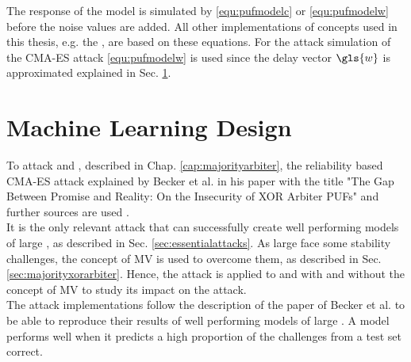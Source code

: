 The response of the \apuf model is simulated by \ref{equ:pufmodelc} or \ref{equ:pufmodelw} before the noise values are added.
All other implementations of \puf concepts used in this thesis, e.g. the \mpuf, are based on these \apuf equations.
For the attack simulation of the \ac{CMA-ES} attack \ref{equ:pufmodelw} is used since the delay vector $\gls{w}$ is approximated explained in Sec. \ref{sec:machinelearningdesign}.


\section{Machine Learning Design}
\label{sec:machinelearningdesign}

To attack \mpufs and \mxpufs, described in Chap. \ref{cap:majorityarbiter}, the reliability based \ac{CMA-ES} attack explained by Becker et al. in his paper with the title "The Gap Between Promise and Reality: On the Insecurity of XOR Arbiter PUFs" and further sources are used \cite{Becker2015ThePUFs,2017CMA-ES,Hansen2011TheTutorial,Hansen2006TheReview}.\\
It is the only relevant attack that can successfully create well performing models of large \xpufs, as described in Sec. \ref{sec:essentialattacks}.
As large \xpufs face some stability challenges, the concept of \ac{MV} is used to overcome them, as described in Sec. \ref{sec:majorityxorarbiter}.
Hence, the attack is applied to \apufs and \xpufs with and without the concept of \ac{MV} to study its impact on the attack.\\
The attack implementations follow the description of the paper of Becker et al. to be able to reproduce their results of well performing models of large \xpufs \cite{Becker2015ThePUFs}.
A model performs well when it predicts a high proportion of the challenges from a test set correct.

